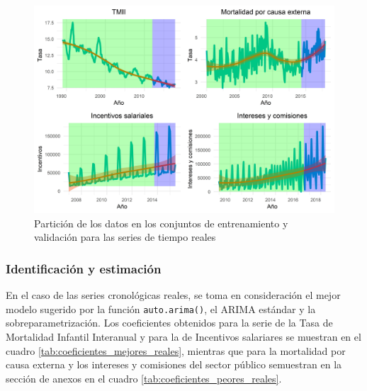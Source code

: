 \documentclass[
]{article}
\begin{document}
\begin{figure}[H]
\includegraphics[width=1\linewidth,height=1\textheight]{Tesis_files/figure-latex/particion_series_reales-1} \caption{Partición de los datos en los conjuntos de entrenamiento y validación para las series de tiempo reales}\label{fig:particion_series_reales}
\end{figure}

\subsubsection{Identificación y estimación}

En el caso de las series cronológicas reales, se toma en consideración
el mejor modelo sugerido por la función \texttt{auto.arima()}, el ARIMA
estándar y la sobreparametrización. Los coeficientes obtenidos para la
serie de la Tasa de Mortalidad Infantil Interanual y para la de
Incentivos salariares se muestran en el cuadro
\ref{tab:coeficientes_mejores_reales}, mientras que para la mortalidad
por causa externa y los intereses y comisiones del sector público
semuestran en la sección de anexos en el cuadro
\ref{tab:coeficientes_peores_reales}.
\end{document}
